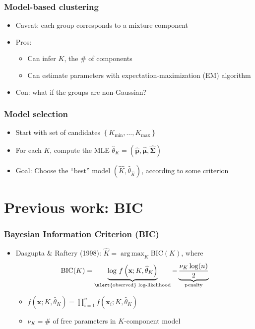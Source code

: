 \documentclass[mathserif,compress]{beamer}
\newcommand*\ba{\[ \begin{aligned}}
\newcommand*\ea{\end{aligned} \]}
\newcommand*\set[1]{\left\{#1\right\}}
\newcommand*\estim[1]{\widehat{#1}}
\DeclareMathOperator*{\argmax}{arg\;max}
\renewcommand\;{\,}
\newcommand{\bx}{\mathbf{x}}
\begin{document}
\begin{frame}\frametitle{Model-based clustering}
\begin{itemize}
\item[] \alert{Caveat:} each group corresponds to a mixture component
\bigskip
\item[]
\alert{Pros:}
\begin{itemize}
\bigskip
\item
Can infer $K$, the \# of components
\bigskip
\item
Can estimate parameters with expectation-maximization (EM) algorithm
\end{itemize}
\bigskip
\item[]
\alert{Con:} what if the groups are non-Gaussian?
\end{itemize}
\end{frame}

\begin{frame}\frametitle{Model selection}
\begin{itemize}
\item[]
Start with set of candidates $\set{K_\text{min}, \dotsc, K_\text{max}}$ 
\bigskip
\item[]
For each $K$, 
compute the MLE 
$\estim\theta_K = (\estim{\mathbf p}, \estim{\pmb\mu}, \estim{\pmb\Sigma})$
\bigskip
\item[]
\alert{Goal}: Choose the ``best'' model $\left(\estim K, \estim\theta_{\estim K}\right)$, according to some criterion
\end{itemize}
\end{frame}

\section{Previous work: BIC}
\begin{frame}\frametitle{Bayesian Information Criterion (BIC)}
\begin{itemize}
\item[]
Dasgupta \& Raftery (1998): $\estim K = \argmax_K \text{BIC}(K)$, where
\bigskip
\ba
\text{BIC}(K)
	= \underbrace{\log \; f\left(\bx; K, \estim\theta_K\right)}_\text{\alert{observed} log-likelihood} 
	- \underbrace{\frac{\nu_K \log(n)}{2}}_\text{penalty}
\ea
\bigskip
\begin{itemize}
\item
$f\left(\bx; K, \estim\theta_K\right) 
= \prod_{i=1}^n f \left(\bx_i; K, \estim\theta_K \right)$
\bigskip
\item
$\nu_K = \# $ of free parameters in $K$-component model
\end{itemize}
\end{itemize}
\end{frame}
\end{document}
